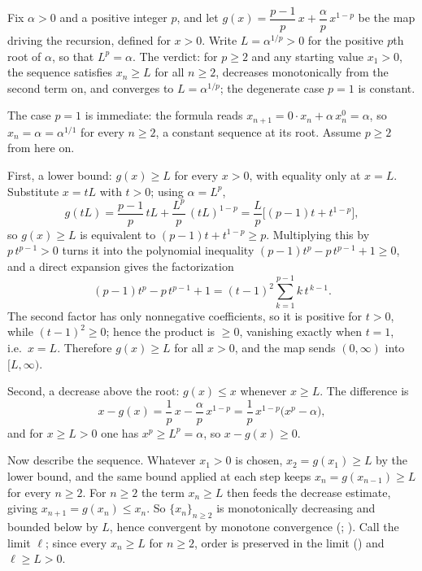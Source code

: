 \documentclass[main.tex]{subfiles}
\begin{document}
\begin{SolutionBlue}
Fix $\alpha>0$ and a positive integer $p$, and let $g(x)=\dfrac{p-1}{p}\,x+\dfrac{\alpha}{p}\,x^{1-p}$ be
the map driving the recursion, defined for $x>0$. Write $L=\alpha^{1/p}>0$ for the positive $p$th root
of $\alpha$, so that $L^{p}=\alpha$. The verdict: for $p\ge 2$ and any starting value $x_{1}>0$, the
sequence satisfies $x_{n}\ge L$ for all $n\ge 2$, decreases monotonically from the second term on, and
converges to $L=\alpha^{1/p}$; the degenerate case $p=1$ is constant.

The case $p=1$ is immediate: the formula reads $x_{n+1}=0\cdot x_{n}+\alpha\,x_{n}^{0}=\alpha$, so
$x_{n}=\alpha=\alpha^{1/1}$ for every $n\ge 2$, a constant sequence at its root. Assume $p\ge 2$ from here
on.

First, a lower bound: $g(x)\ge L$ for every $x>0$, with equality only at $x=L$. Substitute $x=tL$ with
$t>0$; using $\alpha=L^{p}$,
\[
g(tL)=\frac{p-1}{p}\,tL+\frac{L^{p}}{p}\,(tL)^{1-p}
      =\frac{L}{p}\bigl[(p-1)t+t^{1-p}\bigr],
\]
so $g(x)\ge L$ is equivalent to $(p-1)t+t^{1-p}\ge p$. Multiplying this by $p\,t^{p-1}>0$ turns it into
the polynomial inequality $(p-1)t^{p}-p\,t^{p-1}+1\ge 0$, and a direct expansion gives the factorization
\[
(p-1)t^{p}-p\,t^{p-1}+1=(t-1)^{2}\sum_{k=1}^{p-1}k\,t^{\,k-1}.
\]
The second factor has only nonnegative coefficients, so it is positive for $t>0$, while $(t-1)^{2}\ge 0$;
hence the product is $\ge 0$, vanishing exactly when $t=1$, i.e.\ $x=L$. Therefore $g(x)\ge L$ for all
$x>0$, and the map sends $(0,\infty)$ into $[L,\infty)$.

Second, a decrease above the root: $g(x)\le x$ whenever $x\ge L$. The difference is
\[
x-g(x)=\frac{1}{p}\,x-\frac{\alpha}{p}\,x^{1-p}
       =\frac{1}{p}\,x^{1-p}\bigl(x^{p}-\alpha\bigr),
\]
and for $x\ge L>0$ one has $x^{p}\ge L^{p}=\alpha$, so $x-g(x)\ge 0$.

Now describe the sequence. Whatever $x_{1}>0$ is chosen, $x_{2}=g(x_{1})\ge L$ by the lower bound, and the
same bound applied at each step keeps $x_{n}=g(x_{n-1})\ge L$ for every $n\ge 2$. For $n\ge 2$ the term
$x_{n}\ge L$ then feeds the decrease estimate, giving $x_{n+1}=g(x_{n})\le x_{n}$. So $\{x_{n}\}_{n\ge 2}$
is monotonically decreasing and bounded below by $L$, hence convergent by monotone convergence
(; ). Call the limit $\ell$;
since every $x_{n}\ge L$ for $n\ge 2$, order is preserved in the limit () and $\ell\ge L>0$.


\end{SolutionBlue}
\end{document}
